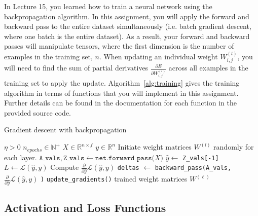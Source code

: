\documentclass[12pt]{article}
\begin{document}
In Lecture 15, you learned how to train a neural network using the backpropagation algorithm. In this assignment, you will apply the forward and backward pass to the entire dataset simultaneously (i.e. batch gradient descent, where one batch is the entire dataset). As a result, your forward and backward passes will manipulate tensors, where the first dimension is the number of examples in the training set, $n$. When updating an individual weight $W^{(l)}_{i,j}$, you will need to find the sum of partial derivatives $\frac{\partial E}{\partial W^{(l)}_{i,j}}$ across all examples in the training set to apply the update. Algorithm~\ref{alg:training} gives the training algorithm in terms of functions that you will implement in this assignment. Further details can be found in the documentation for each function in the provided source code.

\begin{algorithm}[ht!]
\caption{Gradient descent with backpropagation}
\label{alg:training}
    \begin{algorithmic}
        \Require $\eta > 0$ 
        \Require $n_{epochs} \in \mathbb{N}^+$ 
        \Require $X \in \mathbb{R}^{n \times f}$ 
        \Require $y \in \mathbb{R}^{n}$ 
        \State Initiate weight matrices $W^{(l)}$ randomly for each layer.  
         
            \State $\texttt{A\_vals}, \texttt{Z\_vals} \gets \texttt{net.forward\_pass(}X\texttt{)}$ 
            \State $\hat{y} \gets$ \texttt{Z\_vals[-1]} 
            \State $L \gets \mathcal{L}(\hat{y}, y)$
            \State Compute $\frac{\partial }{\partial \hat{y}} \mathcal{L}(\hat{y}, y)$ 
            \State \texttt{deltas} $\gets$ \texttt{backward\_pass(A\_vals,} $\frac{\partial }{\partial \hat{y}} \mathcal{L}(\hat{y}, y)$ \texttt{)} 
            \State \texttt{update\_gradients()} 
        \EndFor
        \State \Return trained weight matrices $W^{(\ell)}$
    \end{algorithmic}
\end{algorithm}

\subsection{Activation and Loss Functions}
\end{document}
